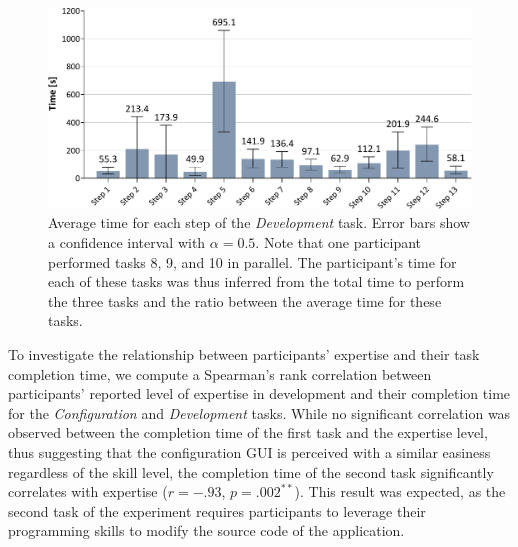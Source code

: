 \begin{figure}[t]
    \centering
    \includegraphics[width=\linewidth]{Figures/QuantumLeap/Evaluation/Task 2 (time).pdf}
    \caption{Average time for each step of the \textit{Development} task. Error bars show a confidence interval with $\alpha{=}0.5$. Note that one participant performed tasks 8, 9, and 10 in parallel. The participant's time for each of these tasks was thus inferred from the total time to perform the three tasks and the ratio between the average time for these tasks.}
    \label{fig:quantumleap:task2-time}
\end{figure}

To investigate the relationship between participants' expertise and their task completion time, we compute a Spearman's rank correlation between participants' reported level of expertise in development and their completion time for the \textit{Configuration} and \textit{Development} tasks. While no significant correlation was observed between the completion time of the first task and the expertise level, thus suggesting that the configuration GUI is perceived with a similar easiness regardless of the skill level, the completion time of the second task significantly correlates with expertise ($r{=}-.93$, $p{=}.002^{**}$). This result was expected, as the second task of the experiment requires participants to leverage their programming skills to modify the source code of the application. 

